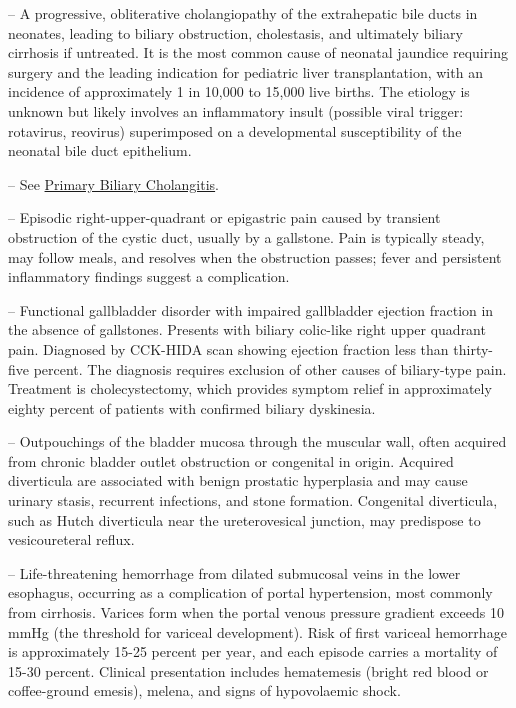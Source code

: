-- A progressive, obliterative cholangiopathy of the extrahepatic bile ducts in neonates, leading to biliary obstruction, cholestasis, and ultimately biliary cirrhosis if untreated. It is the most common cause of neonatal jaundice requiring surgery and the leading indication for pediatric liver transplantation, with an incidence of approximately 1 in 10,000 to 15,000 live births. The etiology is unknown but likely involves an inflammatory insult (possible viral trigger: rotavirus, reovirus) superimposed on a developmental susceptibility of the neonatal bile duct epithelium.

-- See \hyperlink{Primary Biliary Cholangitis}{Primary Biliary Cholangitis}.

-- Episodic right-upper-quadrant or epigastric pain caused by transient obstruction of the cystic duct, usually by a gallstone. Pain is typically steady, may follow meals, and resolves when the obstruction passes; fever and persistent inflammatory findings suggest a complication.

-- Functional gallbladder disorder with impaired gallbladder ejection fraction in the absence of gallstones. Presents with biliary colic-like right upper quadrant pain. Diagnosed by CCK-HIDA scan showing ejection fraction less than thirty-five percent. The diagnosis requires exclusion of other causes of biliary-type pain. Treatment is cholecystectomy, which provides symptom relief in approximately eighty percent of patients with confirmed biliary dyskinesia.

-- Outpouchings of the bladder mucosa through the muscular wall, often acquired from chronic bladder outlet obstruction or congenital in origin. Acquired diverticula are associated with benign prostatic hyperplasia and may cause urinary stasis, recurrent infections, and stone formation. Congenital diverticula, such as Hutch diverticula near the ureterovesical junction, may predispose to vesicoureteral reflux.

-- Life-threatening hemorrhage from dilated submucosal veins in the lower esophagus, occurring as a complication of portal hypertension, most commonly from cirrhosis. Varices form when the portal venous pressure gradient exceeds 10 mmHg (the threshold for variceal development). Risk of first variceal hemorrhage is approximately 15-25 percent per year, and each episode carries a mortality of 15-30 percent. Clinical presentation includes hematemesis (bright red blood or coffee-ground emesis), melena, and signs of hypovolaemic shock.

